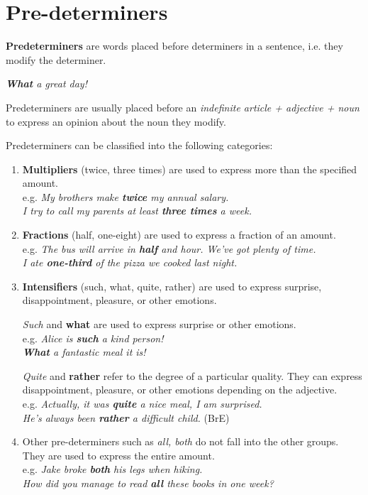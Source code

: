 \documentclass[hidelinks,10pt,a4paper]{article}
\begin{document}
\section{Pre-determiners}
\textbf{Predeterminers} are words placed before determiners in a sentence, i.e. they modify the determiner.

\begin{center}
	\textit{\textbf{What} a great day!}
\end{center}

Predeterminers are usually placed before an \textit{indefinite article + adjective + noun} to express an opinion about the noun they modify.

Predeterminers can be classified into the following categories:
\begin{enumerate}[label=(\alph*)]
	\item \textbf{Multipliers} (twice, three times) are used to express more than the specified amount. \\
		e.g. \textit{My brothers make \textbf{twice} my annual salary. \\
		I try to call my parents at least \textbf{three times} a week. }
	\item \textbf{Fractions} (half, one-eight) are used to express a fraction of an amount. \\
		e.g. \textit{The bus will arrive in \textbf{half} and hour. We've got plenty of time. \\
		I ate \textbf{one-third} of the pizza we cooked last night. }
	\item \textbf{Intensifiers} (such, what, quite, rather) are used to express surprise, disappointment, pleasure, or other emotions.
		\begin{center}
			\textit{Such} and \textbf{what} are used to express surprise or other emotions. \\
		e.g. \textit{Alice is \textbf{such} a kind person!\\
		\textbf{What} a fantastic meal it is! }
		\end{center}
		\begin{center}
			\textit{Quite} and \textbf{rather} refer to the degree of a particular quality. They can express disappointment, pleasure, or other emotions depending on the adjective. \\
			e.g. \textit{Actually, it was \textbf{quite} a nice meal, I am surprised.\\
			He's always been \textbf{rather} a difficult child. } (BrE)
		\end{center}
	\item Other pre-determiners such as \textit{all, both} do not fall into the other groups. They are used to express the entire amount. \\
		e.g. \textit{Jake broke \textbf{both} his legs when hiking.\\
		How did you manage to read \textbf{all} these books in one week? }
\end{enumerate}
\end{document}
